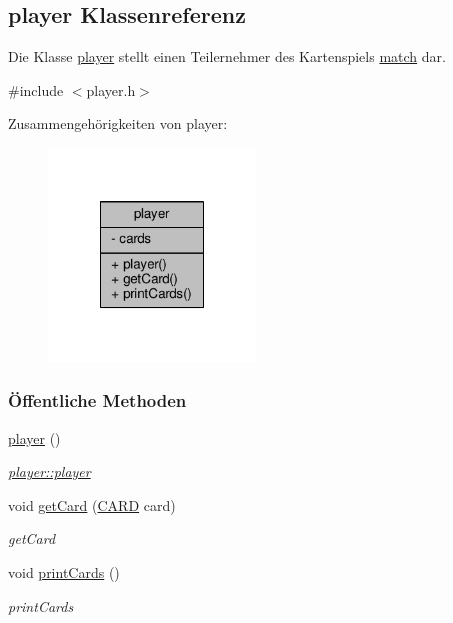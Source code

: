\hypertarget{classplayer}{\subsection{player Klassenreferenz}
\label{classplayer}
}


Die Klasse \hyperlink{classplayer}{player} stellt einen Teilernehmer des Kartenspiels \hyperlink{classmatch}{match} dar.  




{\ttfamily \#include $<$player.\-h$>$}



Zusammengehörigkeiten von player\-:\nopagebreak
\begin{figure}[H]
\begin{center}
\leavevmode
\includegraphics[width=156pt]{d9/d7a/classplayer__coll__graph}
\end{center}
\end{figure}
\subsubsection*{Öffentliche Methoden}
\begin{DoxyCompactItemize}
\item 
\hyperlink{classplayer_a97de83bce15f880241f561b55b016b02}{player} ()
\begin{DoxyCompactList}\small\item\em \hyperlink{classplayer_a97de83bce15f880241f561b55b016b02}{player\-::player} \end{DoxyCompactList}\item 
void \hyperlink{classplayer_a7ee9bffda2073c5ffa036fd978cea86d}{get\-Card} (\hyperlink{struct_c_a_r_d}{C\-A\-R\-D} card)
\begin{DoxyCompactList}\small\item\em get\-Card \end{DoxyCompactList}\item 
void \hyperlink{classplayer_a3dc68b6bb16cc8cb5d2a8bdbe9979bda}{print\-Cards} ()
\begin{DoxyCompactList}\small\item\em print\-Cards \end{DoxyCompactList}\end{DoxyCompactItemize}

